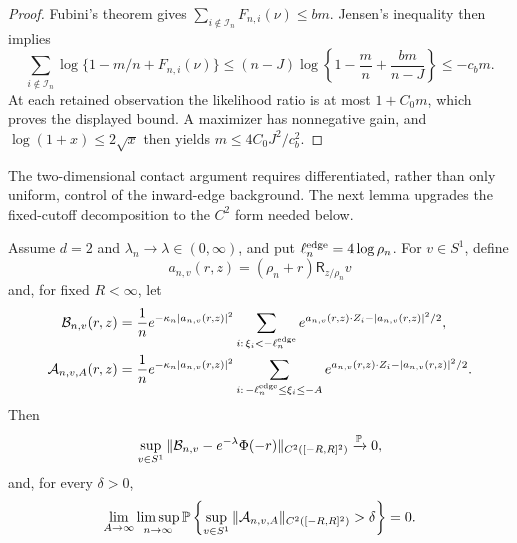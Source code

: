 \begin{proof}
Fubini's theorem gives
\(\sum_{i\notin\mathcal I_n}F_{n,i}(\nu)\le bm\). Jensen's inequality then
implies
\[
 \sum_{i\notin\mathcal I_n}
 \log\{1-m/n+F_{n,i}(\nu)\}
 \le(n-J)\log\left\{1-\frac mn+\frac{bm}{n-J}\right\}
 \le-c_bm.
\]
At each retained observation the likelihood ratio is at most \(1+C_0m\),
which proves the displayed bound. A maximizer has nonnegative gain, and
\(\log(1+x)\le2\sqrt x\) then yields
\(m\le4C_0J^2/c_b^2\).
\end{proof}

The two-dimensional contact argument requires differentiated, rather than only
uniform, control of the inward-edge background. The next lemma upgrades the
fixed-cutoff decomposition to the \(C^2\) form needed below.
\begin{lemma}
\label{lem:support-d2-c2-absorption}
Assume \(d=2\) and \(\lambda_n\to\lambda\in(0,\infty)\), and put
\(\ell_n^{\rm edge}=4\log\rho_n\). For \(v\in S^1\), define
\[
 a_{n,v}(r,z)=(\rho_n+r)\mathsf R_{z/\rho_n}v
\]
and, for fixed \(R<\infty\), let
\begin{align*}
 \mathcal B_{n,v}(r,z)
 &=\frac1n e^{-\kappa_n|a_{n,v}(r,z)|^2}
   \sum_{i:\,\xi_i<-\ell_n^{\rm edge}}
   e^{a_{n,v}(r,z)\cdot Z_i-|a_{n,v}(r,z)|^2/2},\\
 \mathcal A_{n,v,A}(r,z)
 &=\frac1n e^{-\kappa_n|a_{n,v}(r,z)|^2}
   \sum_{i:\,-\ell_n^{\rm edge}\le\xi_i\le-A}
   e^{a_{n,v}(r,z)\cdot Z_i-|a_{n,v}(r,z)|^2/2}.
\end{align*}
Then
\begin{equation}
\label{eq:support-d2-diffuse-c2}
 \sup_{v\in S^1}
 \|\mathcal B_{n,v}-e^{-\lambda}\Phi(-r)\|_{C^2([-R,R]^2)}
 \xrightarrow{\mathbb P}0,
\end{equation}
and, for every \(\delta>0\),
\begin{equation}
\label{eq:support-d2-strip-c2}
 \lim_{A\to\infty}\limsup_{n\to\infty}
 \mathbb P\left\{
   \sup_{v\in S^1}\|\mathcal A_{n,v,A}\|_{C^2([-R,R]^2)}
       >\delta
 \right\}=0.
\end{equation}
\end{lemma}

